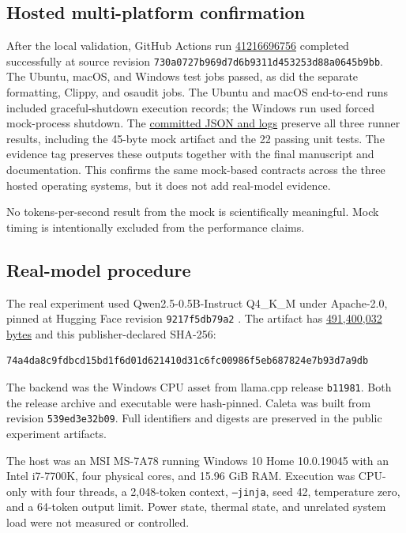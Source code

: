 \documentclass[11pt,a4paper]{article}
\newcommand{\artifact}[2]{\href{https://github.com/BiVelio/caleta/blob/evidence-v1.1/#1}{#2}}
\begin{document}
\subsection{Hosted multi-platform confirmation}

After the local validation, GitHub Actions run \href{https://github.com/BiVelio/caleta/actions/runs/41216696756}{41216696756} completed successfully at source revision \texttt{730a0727b969d7d6b9311d453253d88a0645b9bb}. The Ubuntu, macOS, and Windows test jobs passed, as did the separate formatting, Clippy, and osaudit jobs. The Ubuntu and macOS end-to-end runs included graceful-shutdown execution records; the Windows run used forced mock-process shutdown. The \artifact{experiments/software-validation/results/table1-software-validation.json}{committed JSON and logs} preserve all three runner results, including the 45-byte mock artifact and the 22 passing unit tests. The evidence tag preserves these outputs together with the final manuscript and documentation. This confirms the same mock-based contracts across the three hosted operating systems, but it does not add real-model evidence.

No tokens-per-second result from the mock is scientifically meaningful. Mock timing is intentionally excluded from the performance claims.

\subsection{Real-model procedure}

The real experiment used Qwen2.5-0.5B-Instruct Q4\_K\_M under Apache-2.0, pinned at Hugging Face revision \texttt{9217f5db79a2} \cite{qwenmodel}. The artifact has \artifact{experiments/real-gguf-qwen2.5-0.5b/results/environment.json}{491,400,032 bytes} and this publisher-declared SHA-256:
\begin{lstlisting}
74a4da8c9fdbcd15bd1f6d01d621410d31c6fc00986f5eb687824e7b93d7a9db
\end{lstlisting}
The backend was the Windows CPU asset from llama.cpp release \texttt{b11981}. Both the release archive and executable were hash-pinned. Caleta was built from revision \texttt{539ed3e32b09}. Full identifiers and digests are preserved in the public experiment artifacts.

The host was an MSI MS-7A78 running Windows 10 Home 10.0.19045 with an Intel i7-7700K, four physical cores, and 15.96 GiB RAM. Execution was CPU-only with four threads, a 2,048-token context, \texttt{--jinja}, seed 42, temperature zero, and a 64-token output limit. Power state, thermal state, and unrelated system load were not measured or controlled.
\end{document}
